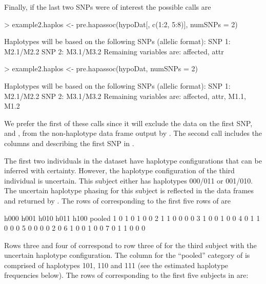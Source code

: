 \documentclass[article, shortnames]{jss}
\begin{document}
Finally, if the last two SNPs were of interest the possible calls are
\begin{Schunk}
\begin{Sinput}
> example2.haplos <- pre.hapassoc(hypoDat[, c(1:2, 5:8)], numSNPs = 2)
\end{Sinput}
\begin{Soutput}
Haplotypes will be based on the following SNPs (allelic format): 
 SNP 1: M2.1/M2.2
 SNP 2: M3.1/M3.2
Remaining variables are: 
 affected, attr 
\end{Soutput}
\begin{Sinput}
> example2.haplos <- pre.hapassoc(hypoDat, numSNPs = 2)
\end{Sinput}
\begin{Soutput}
Haplotypes will be based on the following SNPs (allelic format): 
 SNP 1: M2.1/M2.2
 SNP 2: M3.1/M3.2
Remaining variables are: 
 affected, attr, M1.1, M1.2 
\end{Soutput}
\end{Schunk}

We prefer the first of these calls since it 
will exclude the data on
the first SNP,  and , from the non-haplotype 
data frame 
output by .  The second call includes the 
columns  and  describing the first SNP
in .

The first two individuals in the  dataset 
have haplotype configurations that can be inferred with certainty. 
However, the haplotype configuration of the third individual 
is uncertain. This subject either has haplotypes 000/011 or
001/010. The uncertain haplotype phasing for this subject is reflected 
in the data frames  and  
returned by . The rows of  corresponding 
to the first five rows of  are
\begin{Schunk}
\begin{Soutput}
  h000 h001 h010 h011 h100 pooled
1    0    1    0    1    0      0
2    1    1    0    0    0      0
3    1    0    0    1    0      0
4    0    1    1    0    0      0
5    0    0    0    0    2      0
6    1    0    0    1    0      0
7    0    1    1    0    0      0
\end{Soutput}
\end{Schunk}
Rows three and four of  correspond to row three of 
for the third subject with the uncertain haplotype configuration. 
The column for the ``pooled'' category of  is comprised 
of haplotypes 101, 110 and 111 (see the estimated haplotype frequencies 
below). The rows of  corresponding to the first five 
subjects in  are:
\end{document}
